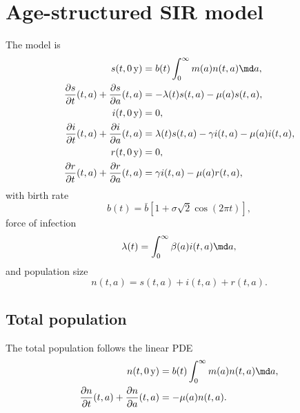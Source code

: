 \documentclass{jpmarticle}
\begin{document}
\section{Age-structured SIR model}

The model is
\begin{equation}
  \label{model_age_structured}
  \begin{split}
    s(t, \unit[0]{y})
    &= b(t) \int_0^\infty m(a) n(t, a) \md a,
    \\
    \frac{\partial s}{\partial t}(t, a)
    + \frac{\partial s}{\partial a}(t, a)
    &= - \lambda(t) s(t, a) - \mu(a) s(t, a),
    \\
    i(t, \unit[0]{y})
    &= 0,
    \\
    \frac{\partial i}{\partial t}(t, a)
    + \frac{\partial i}{\partial a}(t, a)
    &= \lambda(t) s(t, a) - \gamma i(t, a) - \mu(a) i(t, a),
    \\
    r(t, \unit[0]{y})
    &= 0,
    \\
    \frac{\partial r}{\partial t}(t, a)
    + \frac{\partial r}{\partial a}(t, a)
    &= \gamma i(t, a) - \mu(a) r(t, a),
  \end{split}
\end{equation}
with birth rate
\begin{equation}
  b(t) = \bar{b} \left[
    1 + \sigma \sqrt{2} \cos\left(2 \pi t\right)
  \right],
\end{equation}
force of infection
\begin{equation}
  \lambda(t) = \int_0^\infty \beta(a) i(t, a) \md a,
\end{equation}
and population size
\begin{equation}
  n(t, a) = s(t, a) + i(t, a) + r(t, a).
\end{equation}

\subsection{Total population}

The total population follows the linear PDE
\begin{equation}
  \begin{split}
    n(t, \unit[0]{y})
    &= b(t) \int_0^\infty m(a) n(t, a) \md a,
    \\
    \frac{\partial n}{\partial t}(t, a)
    + \frac{\partial n}{\partial a}(t, a)
    &= - \mu(a) n(t, a).
  \end{split}
\end{equation}
\end{document}
